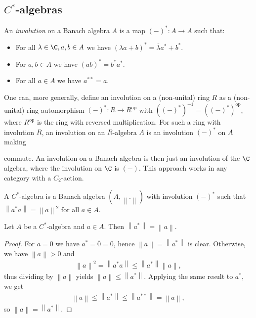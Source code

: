 \documentclass[american]{scrartcl}
\renewcommand{\norm}[1]{\left\lVert #1 \right\rVert}
\newcommand{\inv}{^{-1}}
\newcommand{\conj}[1]{\overline{#1}}
\DeclareMathOperator{\oplow}{op}
\renewcommand{\op}{^{\oplow}}
\begin{document}
\subsection{$C^*$-algebras}
\begin{definition}
	An \textit{involution} on a Banach algebra $A$ is a map $(-)^*:A\to A$ such that:
	\begin{itemize}
		\item For all $\lambda\in \C, a,b\in A$ we have $(\lambda a+b)^*=\conj{\lambda}a^*+b^*$.
		\item For $a,b\in A$ we have $(ab)^*=b^*a^*$.
		\item For all $a\in A$ we have $a^{**}=a$.
	\end{itemize}
\end{definition}
\begin{remark}
	One can, more generally, define an involution on a (non-unital) ring $R$ as a (non-unital) ring automorphism $(-)^*:R\to R\op$ with $((-)^*)\inv = ((-)^*)\op$, where $R\op$ is the ring with reversed multiplication. For such a ring with involution $R$, an involution on an $R$-algebra $A$ is an involution $(-)^*$ on $A$ making
	\begin{center}
	\end{center}
	commute. An involution on a Banach algebra is then just an involution of the $\C$-algebra, where the involution on $\C$ is $\conj{(-)}$. This approach works in any category with a $C_2$-action.
\end{remark}
\begin{definition}
	A $C^*$-algebra is a Banach algebra $(A,\norm{.})$ with involution $(-)^*$ such that $\norm{a^*a}=\norm{a}^2$ for all $a\in A$.
\end{definition}
\begin{lemma}
	Let $A$ be a $C^*$-algebra and $a\in A$. Then $\norm{a^*}=\norm{a}$.
\end{lemma}
\begin{proof}
	For $a=0$ we have $a^*=\conj{0}=0$, hence $\norm{a}=\norm{a^*}$ is clear. Otherwise, we have $\norm{a}>0$ and
	\begin{align*}
		\norm{a}^2=\norm{a^*a}\leq \norm{a^*}\norm{a},
	\end{align*}
	thus dividing by $\norm{a}$ yields $\norm{a}\leq \norm{a^*}$. Applying the same result to $a^*$, we get
	\begin{align*}
		\norm{a}\leq\norm{a^*}\leq\norm{a^{**}}=\norm{a},
	\end{align*}
	so $\norm{a}=\norm{a^*}$.
\end{proof}
\end{document}
